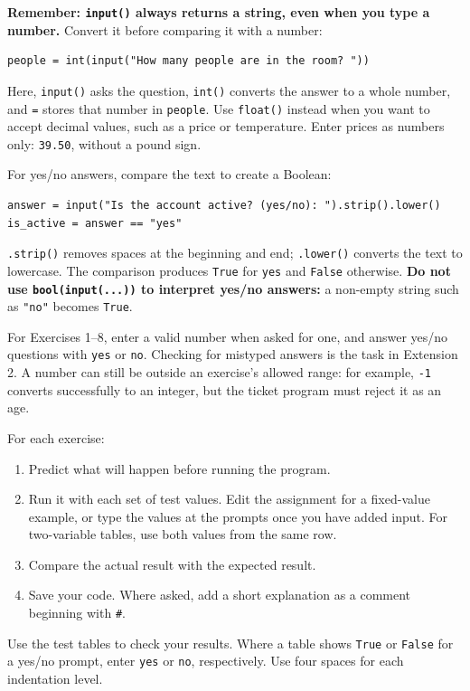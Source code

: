 \documentclass[12pt,a4paper]{article}
\begin{document}
\textbf{Remember: \texttt{input()} always returns a string, even when you type a number.} Convert it before comparing it with a number:

\begin{minipage}{\linewidth}
\begin{lstlisting}
people = int(input("How many people are in the room? "))
\end{lstlisting}
\end{minipage}
\par
Here, \texttt{input()} asks the question, \texttt{int()} converts the answer to a whole number, and \texttt{=} stores that number in \texttt{people}. Use \texttt{float()} instead when you want to accept decimal values, such as a price or temperature. Enter prices as numbers only: \texttt{39.50}, without a pound sign.

For yes/no answers, compare the text to create a Boolean:

\begin{minipage}{\linewidth}
\begin{lstlisting}
answer = input("Is the account active? (yes/no): ").strip().lower()
is_active = answer == "yes"
\end{lstlisting}
\end{minipage}
\par
\texttt{.strip()} removes spaces at the beginning and end; \texttt{.lower()} converts the text to lowercase. The comparison produces \texttt{True} for \texttt{yes} and \texttt{False} otherwise. \textbf{Do not use \texttt{bool(input(...))} to interpret yes/no answers:} a non-empty string such as \texttt{"no"} becomes \texttt{True}.

For Exercises 1–8, enter a valid number when asked for one, and answer yes/no questions with \texttt{yes} or \texttt{no}. Checking for mistyped answers is the task in Extension 2. A number can still be outside an exercise's allowed range: for example, \texttt{-1} converts successfully to an integer, but the ticket program must reject it as an age.

For each exercise:

\begin{enumerate}
\item Predict what will happen before running the program.
\item Run it with each set of test values. Edit the assignment for a fixed-value example, or type the values at the prompts once you have added input. For two-variable tables, use both values from the same row.
\item Compare the actual result with the expected result.
\item Save your code. Where asked, add a short explanation as a comment beginning with \texttt{\#}.
\end{enumerate}
Use the test tables to check your results. Where a table shows \texttt{True} or \texttt{False} for a yes/no prompt, enter \texttt{yes} or \texttt{no}, respectively. Use four spaces for each indentation level.
\end{document}
